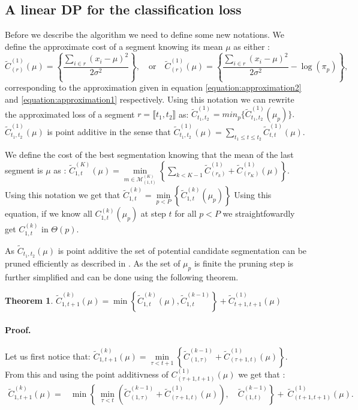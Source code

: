 \documentclass[article,10pt]{llncs}
\newtheorem{theo}{Theorem}[section]    %
\begin{document}
\subsection{A linear DP for the classification loss}

Before we describe the algorithm we need to define some new notations.
We define the approximate cost of a segment knowing its mean $\mu$ as either :
$$ \widetilde{C}_{(r)}^{(1)}  (\mu) = \left\{ \frac{\sum_{i \in r} (x_i - \mu)^2  }{ 2 \sigma^2} \right\}, 
\quad \text{or} \quad 
 \widetilde{C}_{(r)}^{(1)}   (\mu) = \left\{ \frac{\sum_{i \in r} (x_i - \mu)^2  } {2 \sigma^2 } - \log(\pi_p) \right\},$$
corresponding to the approximation given in equation \ref{equation:approximation2} and \ref{equation:approximation1} respectively.
Using this notation we can rewrite the approximated loss of a segment $r = \llbracket t_1, t_2 \rrbracket$ as:
$ \widetilde{C}_{t_1, t_2}^{(1)}  = min_p \{  \widetilde{C}_{t_1, t_2}^{(1)}  (\mu_p) \}.$
$\widetilde{C}_{t_1, t_2}^{(1)}  (\mu)$ is point additive in the sense that 
$\widetilde{C}_{t_1, t_2}^{(1)}  (\mu) = \underset{ t_1 \leq t \leq t_2}{\sum} \widetilde{C}_{t, t}^{(1)}  (\mu).$

We define the cost of the best segmentation knowing that the mean of the last segment is $\mu$ as :
$ \widetilde{C}_{1, t}^{(K)}(\mu) = \underset{{m \in \mathcal{M}^{(K)}_{(1, t)}}}{\min} \left\{ \sum_{k < K-1}  \widetilde{C}^{(1)}_{(r_k)}  + \widetilde{C}^{(1)}_{(r_K)}(\mu) \right\}.$
Using this notation we get that
$ \widetilde{C}_{1, t}^{(k)}  = \underset{p < P}{\min} \left\{ \widetilde{C}_{1, t}^{(k)}(\mu_p) \right\}$
Using this equation, if we know all $C_{1, t}^{(k)}(\mu_p)$ at step $t$ for all $p < P$ we straightfowardly get $C_{1, t}^{(k)}$ in $\Theta(p)$.


As $\widetilde{C}_{t_1, t_2} (\mu)$ is point additive the set of potential candidate segmentation can be pruned efficiently as described
in \cite{rigaill_2010}. 
As the set of $\mu_p$ is finite the pruning step is further simplified and can be done using the following theorem.

\begin{theo}
$ \widetilde{C}_{1, t+1}^{(k)}(\mu) = \min \left\{ \widetilde{C}_{1, t}^{(k)}(\mu),  \widetilde{C}_{1, t}^{(k-1)} \right\} +  \widetilde{C}_{t+1, t+1}^{(1)}(\mu) $
\end{theo}

\paragraph{Proof. } Let us first notice that: 
$ \widetilde{C}_{1, t+1}^{(k)}(\mu) =  \underset{{\tau < t+1} }{\min}\left\{  \widetilde{C}_{(1,\tau)}^{(k-1)}  +  \widetilde{C}_{(\tau+1, t)}^{(1)}(\mu) \right\}
.$
From this and using the point additivness of $ C_{(\tau+1, t+1)}^{(1)}(\mu)$ we get that :
\begin{eqnarray*}
 \widetilde{C}_{1, t+1}^{(k)}(\mu) = & \min \left\{ \ \underset{{\tau < t}}{\min} \left(  \widetilde{C}_{(1,\tau)}^{(k-1)}  +  \widetilde{C}_{(\tau+1, t)}^{(1)}(\mu) \right), \quad  \widetilde{C}_{(1,t)}^{(k-1)}  \right\} +  \ \widetilde{C}_{(t+1, t+1)}^{(1)}(\mu).
\end{eqnarray*}
\end{document}

